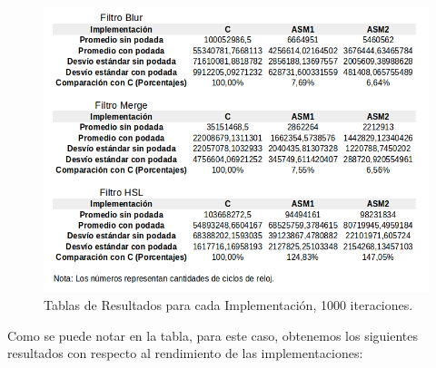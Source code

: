 \begin{figure}[ht!]
\centering
\includegraphics[width=150mm]{imagenes/resultados/tablacomparacion.png}
\caption{Tablas de Resultados para cada Implementación, 1000 iteraciones.}
\end{figure}

Como se puede notar en la tabla, para este caso, obtenemos los siguientes resultados con respecto al rendimiento de las implementaciones:

